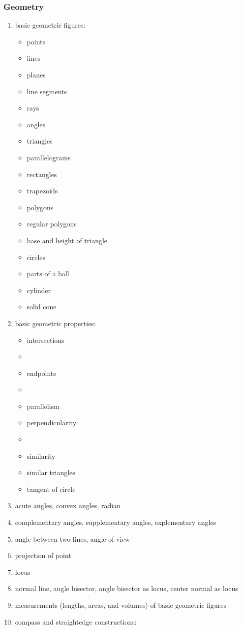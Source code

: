 \documentclass[12pt]{article}
\begin{document}
\subsubsection*{Geometry}
\begin{enumerate}
\item basic geometric figures:

\begin{itemize}
\item points
\item lines
\item planes
\item line segments
\item rays
\item angles
\item triangles
\item parallelograms
\item rectangles
\item trapezoids
\item polygons
\item regular polygons
\item base and height of triangle
\item circles
\item parts of a ball
\item cylinder
\item solid cone
\end{itemize}

\item basic geometric properties:

\begin{itemize}
\item intersections
\item {}
\item endpoints
\item {}
\item parallelism
\item perpendicularity
\item {}
\item similarity
\item similar triangles
\item tangent of circle
\end{itemize}

\item acute angles, convex angles, radian
\item complementary angles, supplementary angles, explementary angles
\item angle between two lines, angle of view
\item projection of point
\item locus
\item normal line, angle bisector, angle bisector as locus, center normal as locus
\item measurements (lengths, areas, and volumes) of basic geometric figures
\item compass and straightedge constructions:


\end{enumerate}
\end{document}
